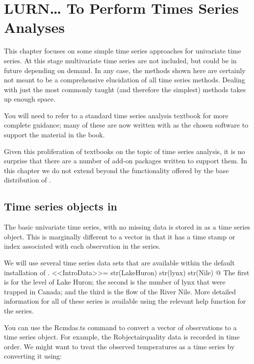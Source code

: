 \chapter{LURN\ldots{} To Perform Times Series Analyses}
\label{TimeSeries}



This chapter focuses on some simple time series approaches for univariate time series. At this stage multivariate time series are not included, but could be in future depending on demand. In any case, the methods shown here are certainly not meant to be a comprehensive elucidation of all time series methods. Dealing with just the most commonly taught (and therefore the simplest) methods takes up enough space. 

You will need to refer to a standard time series analysis textbook for more complete guidance; many of these are now written with \R{} as the chosen software to support the material in the book.

Given this proliferation of textbooks on the topic of time series analysis, it is no surprise that there are a number of add-on packages written to support them. In this chapter we do not extend beyond the functionality offered by the base distribution of \R{}.

\section{Time series objects in \R{}}

The basic univariate time series, with no missing data is stored in \R{} as a time series object. This is marginally different to a vector in that it has a time stamp or index associated with each observation in the series.

We will use several time series data sets that are available within the default installation of \R{}. <<IntroData>>=
str(LakeHuron)
str(lynx)
str(Nile)
@
The first is for the level of Lake Huron; the second is the number of lynx that were trapped in Canada; and the third is the flow of the River Nile. More detailed information for all of these series is available using the relevant help function for the series.

You can use the Rcmd{as.ts} command to convert a vector of observations to a time series object. For example, the Robject{airquality} data is recorded in time order. We might want to treat the observed temperatures as a time series by converting it using:
\begin{Schunk}
\end{Schunk}

